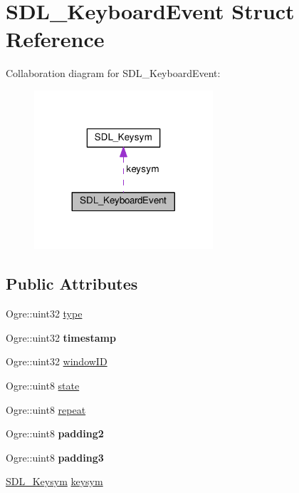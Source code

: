 \hypertarget{struct_s_d_l___keyboard_event}{}\section{S\+D\+L\+\_\+\+Keyboard\+Event Struct Reference}
\label{struct_s_d_l___keyboard_event}


Collaboration diagram for S\+D\+L\+\_\+\+Keyboard\+Event\+:\nopagebreak
\begin{figure}[H]
\begin{center}
\leavevmode
\includegraphics[width=188pt]{struct_s_d_l___keyboard_event__coll__graph}
\end{center}
\end{figure}
\subsection*{Public Attributes}
\begin{DoxyCompactItemize}
\item 
Ogre\+::uint32 \hyperlink{struct_s_d_l___keyboard_event_a1a3eea65c5a9af99bc19f492cbe9ad60}{type}
\item 
\mbox{\label{struct_s_d_l___keyboard_event_a40d7efcf7d62dfb549f0b5e81755602c}} 
Ogre\+::uint32 {\bfseries timestamp}
\item 
Ogre\+::uint32 \hyperlink{struct_s_d_l___keyboard_event_a1f39f22a6dc08d06ddc21ceff061a289}{window\+ID}
\item 
Ogre\+::uint8 \hyperlink{struct_s_d_l___keyboard_event_a54f998fe45b7da252c1aee14e0f80208}{state}
\item 
Ogre\+::uint8 \hyperlink{struct_s_d_l___keyboard_event_a242537ff16ce0a0039d664e4c4d1c40d}{repeat}
\item 
\mbox{\label{struct_s_d_l___keyboard_event_ac0940b901240fa603127da42efee8ad9}} 
Ogre\+::uint8 {\bfseries padding2}
\item 
\mbox{\label{struct_s_d_l___keyboard_event_a7dc597342fbbc88e20598d6c4e92bc0c}} 
Ogre\+::uint8 {\bfseries padding3}
\item 
\hyperlink{struct_s_d_l___keysym}{S\+D\+L\+\_\+\+Keysym} \hyperlink{struct_s_d_l___keyboard_event_a2a57ba820a298f2c02ad5d41fd2b1aa8}{keysym}
\end{DoxyCompactItemize}


